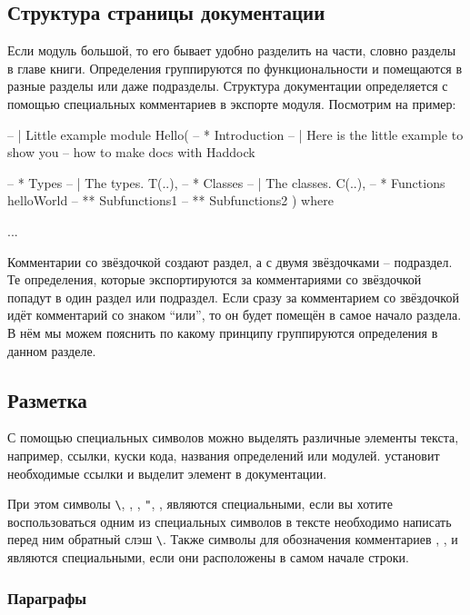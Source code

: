 \subsection{Структура страницы документации}

Если модуль большой, то его бывает удобно разделить на части, словно
разделы в главе книги. Определения группируются по функциональности и
помещаются в разные разделы или даже подразделы. Структура документации
определяется с помощью специальных комментариев в экспорте модуля.
Посмотрим на пример:


\begin{code}
-- | Little example
module Hello(
    -- * Introduction
    -- | Here is the little example to show you
    -- how to make docs with Haddock
    
    -- * Types
    -- | The types.
    T(..),
    -- * Classes
    -- | The classes.
    C(..),
    -- * Functions
    helloWorld
    -- ** Subfunctions1
    -- ** Subfunctions2    
) where

...
\end{code}

Комментарии со звёздочкой создают раздел, а с двумя звёздочками --
подраздел. Те определения, которые экспортируются за комментариями со
звёздочкой попадут в один раздел или подраздел. Если сразу за
комментарием со звёздочкой идёт комментарий со знаком ``или'', то он
будет помещён в самое начало раздела. В нём мы можем пояснить по какому
принципу группируются определения в данном разделе.

\subsection{Разметка}

С помощью специальных символов можно выделять различные элементы текста,
например, ссылки, куски кода, названия определений или модулей.
 установит необходимые ссылки и выделит элемент в
документации.

При этом символы \In{}\verb!\!\In{}, , , \In{}\verb!"!\In{},
, \In{<} являются специальными, если вы хотите воспользоваться
одним из специальных символов в тексте необходимо написать перед ним
обратный слэш \In{}\verb!\!\In{}. Также символы для обозначения
комментариев \In{*}, \In{|}, \In{^} и \In{>} являются специальными, если
они расположены в самом начале строки.

\subsubsection{Параграфы}

